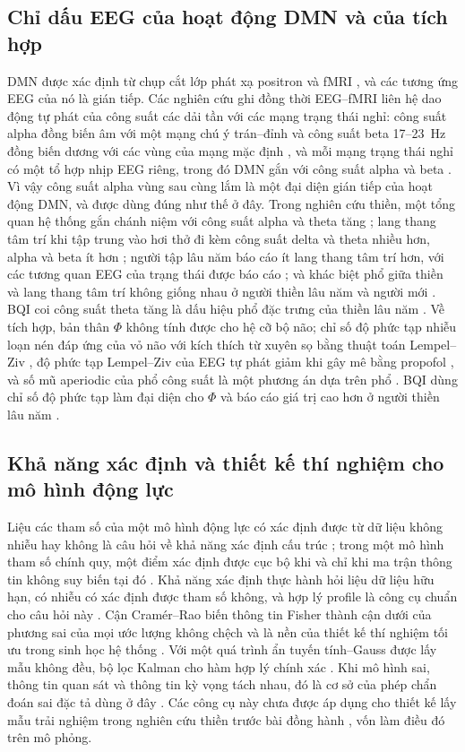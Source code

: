 \subsection{Chỉ dấu EEG của hoạt động DMN và của tích hợp}
DMN được xác định từ chụp cắt lớp phát xạ positron và fMRI \cite{Raichle2001}, và các tương ứng EEG của nó là gián tiếp. Các nghiên cứu ghi đồng thời EEG--fMRI liên hệ dao động tự phát của công suất các dải tần với các mạng trạng thái nghỉ: công suất alpha đồng biến âm với một mạng chú ý trán--đỉnh và công suất beta 17--23~Hz đồng biến dương với các vùng của mạng mặc định \cite{Laufs2003}, và mỗi mạng trạng thái nghỉ có một tổ hợp nhịp EEG riêng, trong đó DMN gắn với công suất alpha và beta \cite{Mantini2007}. Vì vậy công suất alpha vùng sau cùng lắm là một đại diện gián tiếp của hoạt động DMN, và được dùng đúng như thế ở đây. Trong nghiên cứu thiền, một tổng quan hệ thống gắn chánh niệm với công suất alpha và theta tăng \cite{Lomas2015}; lang thang tâm trí khi tập trung vào hơi thở đi kèm công suất delta và theta nhiều hơn, alpha và beta ít hơn \cite{Braboszcz2011}; người tập lâu năm báo cáo ít lang thang tâm trí hơn, với các tương quan EEG của trạng thái được báo cáo \cite{Brandmeyer2018}; và khác biệt phổ giữa thiền và lang thang tâm trí không giống nhau ở người thiền lâu năm và người mới \cite{RodriguezLarios2021}. BQI coi công suất theta tăng là dấu hiệu phổ đặc trưng của thiền lâu năm \cite[Phụ lục~B.2]{BQI}. Về tích hợp, bản thân $\Phi$ không tính được cho hệ cỡ bộ não; chỉ số độ phức tạp nhiễu loạn nén đáp ứng của vỏ não với kích thích từ xuyên sọ bằng thuật toán Lempel--Ziv \cite{Casali2013}, độ phức tạp Lempel--Ziv của EEG tự phát giảm khi gây mê bằng propofol \cite{Schartner2015}, và số mũ aperiodic của phổ công suất là một phương án dựa trên phổ \cite{Donoghue2020}. BQI dùng chỉ số độ phức tạp làm đại diện cho $\Phi$ và báo cáo giá trị cao hơn ở người thiền lâu năm \cite[Mục~6.3]{BQI}.

\subsection{Khả năng xác định và thiết kế thí nghiệm cho mô hình động lực}
Liệu các tham số của một mô hình động lực có xác định được từ dữ liệu không nhiễu hay không là câu hỏi về khả năng xác định cấu trúc \cite{Bellman1970}; trong một mô hình tham số chính quy, một điểm xác định được cục bộ khi và chỉ khi ma trận thông tin không suy biến tại đó \cite{Rothenberg1971}. Khả năng xác định thực hành hỏi liệu dữ liệu hữu hạn, có nhiễu có xác định được tham số không, và hợp lý profile là công cụ chuẩn cho câu hỏi này \cite{Raue2009,Wieland2021}. Cận Cramér--Rao \cite{Rao1945,Cramer1946} biến thông tin Fisher thành cận dưới của phương sai của mọi ước lượng không chệch và là nền của thiết kế thí nghiệm tối ưu trong sinh học hệ thống \cite{Kreutz2009}. Với một quá trình ẩn tuyến tính--Gauss được lấy mẫu không đều, bộ lọc Kalman cho hàm hợp lý chính xác \cite{Kalman1960,Harvey1989,Durbin2012}. Khi mô hình sai, thông tin quan sát và thông tin kỳ vọng tách nhau, đó là cơ sở của phép chẩn đoán sai đặc tả dùng ở đây \cite{White1982}. Các công cụ này chưa được áp dụng cho thiết kế lấy mẫu trải nghiệm trong nghiên cứu thiền trước bài đồng hành \cite{companion}, vốn làm điều đó trên mô phỏng.

